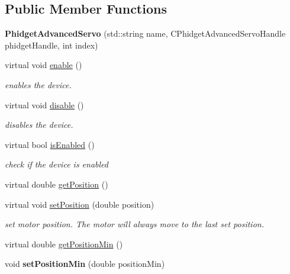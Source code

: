 \subsection*{Public Member Functions}
\begin{DoxyCompactItemize}
\item 
\hypertarget{classdrobot_1_1device_1_1actuator_1_1PhidgetAdvancedServo_aad070d3a5cb924e0b51d5728e8c74519}{{\bfseries Phidget\-Advanced\-Servo} (std\-::string name, C\-Phidget\-Advanced\-Servo\-Handle phidget\-Handle, int index)}\label{classdrobot_1_1device_1_1actuator_1_1PhidgetAdvancedServo_aad070d3a5cb924e0b51d5728e8c74519}

\item 
virtual void \hyperlink{classdrobot_1_1device_1_1actuator_1_1PhidgetAdvancedServo_aff32b9715c9095ed27b8b6268706b778}{enable} ()
\begin{DoxyCompactList}\small\item\em enables the device. \end{DoxyCompactList}\item 
virtual void \hyperlink{classdrobot_1_1device_1_1actuator_1_1PhidgetAdvancedServo_a62ef62d1c2052af2f2b2db1443e21c1b}{disable} ()
\begin{DoxyCompactList}\small\item\em disables the device. \end{DoxyCompactList}\item 
virtual bool \hyperlink{classdrobot_1_1device_1_1actuator_1_1PhidgetAdvancedServo_aaae782fc07c5fea70969560713c36d8c}{is\-Enabled} ()
\begin{DoxyCompactList}\small\item\em check if the device is enabled \end{DoxyCompactList}\item 
virtual double \hyperlink{classdrobot_1_1device_1_1actuator_1_1PhidgetAdvancedServo_aa3661ee800d3f130322abcd125a103ee}{get\-Position} ()
\item 
virtual void \hyperlink{classdrobot_1_1device_1_1actuator_1_1PhidgetAdvancedServo_a97cf6ba7524e113eeaa8bbe44ff3058a}{set\-Position} (double position)
\begin{DoxyCompactList}\small\item\em set motor position. The motor will always move to the last set position. \end{DoxyCompactList}\item 
virtual double \hyperlink{classdrobot_1_1device_1_1actuator_1_1PhidgetAdvancedServo_afd48104555df3fa2a8750eb19c118417}{get\-Position\-Min} ()
\item 
\hypertarget{classdrobot_1_1device_1_1actuator_1_1PhidgetAdvancedServo_ae59942ddcbe6d71a0cede7c907e4f569}{void {\bfseries set\-Position\-Min} (double position\-Min)}\label{classdrobot_1_1device_1_1actuator_1_1PhidgetAdvancedServo_ae59942ddcbe6d71a0cede7c907e4f569}


\end{DoxyCompactItemize}
